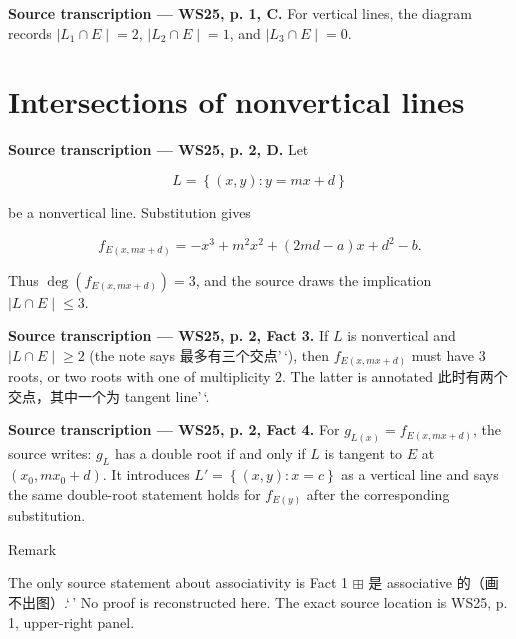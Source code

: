 \textbf{Source transcription --- WS25, p. 1, C.} For vertical lines, the diagram records \(\left. |L_{1} \cap E \middle| = 2 \right.\), \(\left. |L_{2} \cap E \middle| = 1 \right.\), and \(\left. |L_{3} \cap E \middle| = 0 \right.\).

\section{Intersections of nonvertical lines}

\textbf{Source transcription --- WS25, p. 2, D.} Let

\[L = \left\{ {\left( {x,y} \right):y = mx + d} \right\}\]

be a nonvertical line. Substitution gives

\[f_{E{({x,mx + d})}} = - x^{3} + m^{2}x^{2} + \left( {2md - a} \right)x + d^{2} - b.\]

Thus \(\deg\left( f_{E{({x,mx + d})}} \right) = 3\), and the source draws the implication \(\left. |L \cap E \middle| \leq 3 \right.\).

\textbf{Source transcription --- WS25, p. 2, Fact 3.} If \(L\) is nonvertical and \(\left. |L \cap E \middle| \geq 2 \right.\) (the note says 最多有三个交点'\,`), then \(f_{E{({x,mx + d})}}\) must have \(3\) roots, or two roots with one of multiplicity \(2\). The latter is annotated 此时有两个交点，其中一个为 tangent line'\,`.

\textbf{Source transcription --- WS25, p. 2, Fact 4.} For \(g_{L{(x)}} = f_{E{({x,mx + d})}}\), the source writes: \(g_{L}\) has a double root if and only if \(L\) is tangent to \(E\) at \(\left( {x_{0},mx_{0} + d} \right)\). It introduces \(L' = \left\{ {\left( {x,y} \right):x = c} \right\}\) as a vertical line and says the same double-root statement holds for \(f_{E{(y)}}\) after the corresponding substitution.

\begin{qlremark}{Remark}

The only source statement about associativity is Fact 1 \(\boxplus\) 是 associative 的（画不出图）.`\,' No proof is reconstructed here. The exact source location is WS25, p. 1, upper-right panel.

\end{qlremark}
